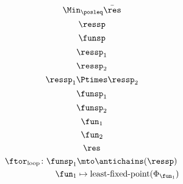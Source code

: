 {\begin{forslides}
\begin{equation}
            \label{eq:opt_6}
            \Min_{\posleq}\bar{\res}
        \end{equation}
        \begin{equation}
            \label{eq:genfun_1}
            \ressp
        \end{equation}
        \begin{equation}
            \label{eq:genfun_2}
            \funsp
        \end{equation}
        \begin{equation}
            \label{eq:genfun_3}
            \ressp_1
        \end{equation}
        \begin{equation}
            \label{eq:genfun_3_1}
            \ressp_2
        \end{equation}
        \begin{equation}
            \label{eq:genfun_3_2}
            \ressp_1\Ptimes \ressp_2
        \end{equation}
        \begin{equation}
            \label{eq:genfun_4}
            \funsp_1
        \end{equation}
        \begin{equation}
            \label{eq:genfun_5}
            \funsp_2
        \end{equation}
        \begin{equation}
            \label{eq:genfun_6}
            \fun_1
        \end{equation}
        \begin{equation}
            \label{eq:genfun_7}
            \fun_2
        \end{equation}
        \begin{equation}
            \label{eq:genfun_8}
            \res
        \end{equation}
        \begin{equation}
            \label{eq:genfun_9}
            \begin{aligned}
                \ftor_\mathrm{loop}\colon \funsp_1 & \mto \antichains(\ressp) \\
                \fun_1                             & \mapsto \text{least-fixed-point}(\Phi_{\fun_1})
            \end{aligned}
        \end{equation}
        \begin{equation}
            \label{eq:genfun_10}
            \begin{aligned}

\end{aligned}
\end{equation}
\end{forslides}}
